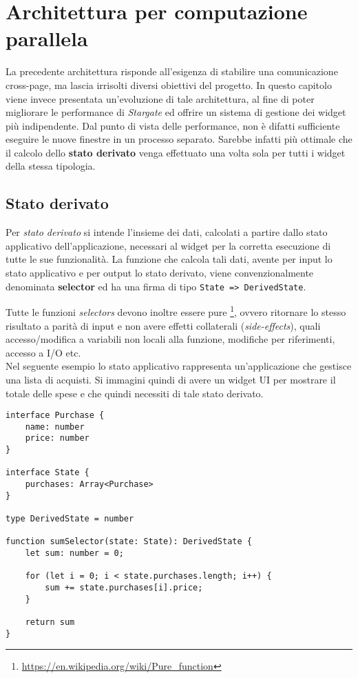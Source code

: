 
\chapter{Architettura per computazione parallela}
\label{cap:architettura-computazione-parallela}

La precedente architettura risponde all'esigenza di stabilire una comunicazione cross-page, ma lascia irrisolti diversi obiettivi del progetto. In questo capitolo viene invece presentata un'evoluzione di tale architettura, al fine di poter migliorare le performance di \textit{Stargate} ed offrire un sistema di gestione dei widget più indipendente.
Dal punto di vista delle performance, non è difatti sufficiente eseguire le nuove finestre in un processo separato. Sarebbe infatti più ottimale che il calcolo dello \textbf{stato derivato} venga effettuato una volta sola per tutti i widget della stessa tipologia.

\section{Stato derivato}

Per \textit{stato derivato} si intende l'insieme dei dati, calcolati a partire dallo stato applicativo dell'applicazione, necessari al widget per la corretta esecuzione di tutte le sue funzionalità. La funzione che calcola tali dati, avente per input lo stato applicativo e per output lo stato derivato, viene convenzionalmente denominata \textbf{selector} ed ha una firma di tipo \texttt{State => DerivedState}.

Tutte le funzioni \textit{selectors} devono inoltre essere pure \footnote{\url{https://en.wikipedia.org/wiki/Pure_function}}, ovvero ritornare lo stesso risultato a parità di input e non avere effetti collaterali (\textit{side-effects}), quali accesso/modifica a variabili non locali alla funzione, modifiche per riferimenti, accesso a I/O etc. \\

Nel seguente esempio lo stato applicativo rappresenta un'applicazione che gestisce una lista di acquisti. Si immagini quindi di avere un widget UI per mostrare il totale delle spese e che quindi necessiti di tale stato derivato.

\begin{lstlisting}[language={[Sharp]C},basicstyle=\footnotesize]
interface Purchase {
    name: number
    price: number
}

interface State {
    purchases: Array<Purchase>
}

type DerivedState = number

function sumSelector(state: State): DerivedState {
    let sum: number = 0;

    for (let i = 0; i < state.purchases.length; i++) {
        sum += state.purchases[i].price;
    }

    return sum
}
\end{lstlisting}

